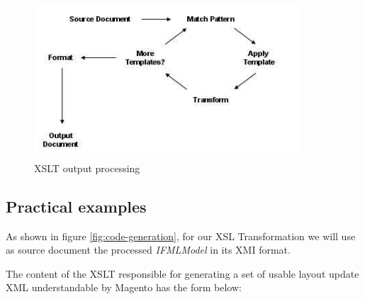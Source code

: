  
\vspace{0.5cm}
\begin{figure}[H]
  \centering
    \includegraphics[width=10cm]{images/xslt-processing.jpg}
  \caption{XSLT output processing}
  \label{fig:xslt-processing}
\end{figure}
\vspace{0.5cm}


\subsection{Practical examples}

As shown in figure \ref{fig:code-generation}, for our XSL Transformation we will use as source document the processed \textit{IFMLModel} in its XMI format.

The content of the XSLT responsible for generating a set of usable layout update XML understandable by Magento has the form below:

